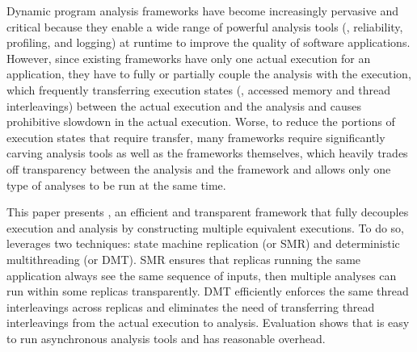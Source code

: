 
Dynamic program analysis frameworks have become increasingly pervasive and 
critical because they enable a wide range of powerful analysis tools (\eg, 
reliability, profiling, and logging) at runtime to improve the quality of 
software applications. However, since existing frameworks have only one actual 
execution for an application, they have to fully or partially couple the 
analysis with the execution, which frequently transferring execution states 
(\eg, accessed memory and thread interleavings) between the actual execution 
and the analysis and causes prohibitive slowdown in the actual execution. 
Worse, to reduce the portions of execution states that require transfer, many 
frameworks require significantly carving analysis tools as well as the 
frameworks themselves, which heavily trades off transparency between the 
analysis and the framework and allows only one type of analyses to be run at 
the same time.


This paper presents \xxx, an efficient and transparent framework that fully 
decouples execution and analysis by constructing multiple equivalent 
executions. To do so, \xxx leverages two techniques: state machine replication 
(or SMR) and deterministic multithreading (or DMT). SMR ensures that replicas 
running the same application always see the same sequence of inputs, then 
multiple analyses can run within some replicas transparently. DMT efficiently 
enforces the same thread interleavings across replicas and eliminates the need 
of transferring thread interleavings from the actual execution to analysis. 
Evaluation shows that \xxx is easy to run asynchronous analysis tools and has 
reasonable overhead.